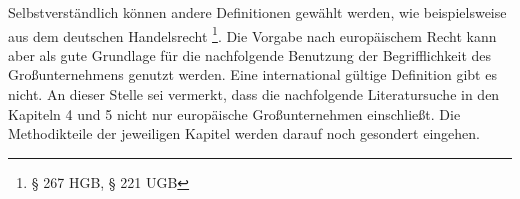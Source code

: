 Selbstverständlich können andere Definitionen gewählt werden, wie beispielsweise aus dem deutschen Handelsrecht \footnote{ § 267 HGB, § 221 UGB}. Die Vorgabe nach europäischem Recht kann aber als gute Grundlage für die nachfolgende Benutzung der Begrifflichkeit des Großunternehmens genutzt werden. Eine international gültige Definition gibt es nicht. An dieser Stelle sei vermerkt, dass die nachfolgende Literatursuche in den Kapiteln 4 und 5 nicht nur europäische Großunternehmen einschließt. Die Methodikteile der jeweiligen Kapitel werden darauf noch gesondert eingehen.